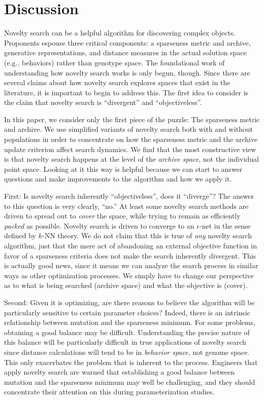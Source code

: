 \documentclass[twoside]{article}
\begin{document}
\section{Discussion}
\label{sec:discussion}

Novelty search can be a helpful algorithm for discovering complex objects.  Proponents espouse three critical components:  a sparseness metric and archive, generative representations, and distance measures in the actual solution space (e.g., behaviors) rather than genotype space.  The foundational work of understanding how novelty search works is only begun, though.  Since there are several claims about how novelty search explores spaces that exist in the literature, it is important to begin to address this.  The first idea to consider is the claim that novelty search is ``divergent'' and ``objectiveless''.  

In this paper, we consider only the first piece of the puzzle:  The sparseness metric and archive.  We use simplified variants of novelty search both with and without populations in order to concentrate on how the sparseness metric and the archive update criterion affect search dynamics.  We find that the most constructive view is that novelty search happens at the level of the \emph{archive space}, not the individual point space.  Looking at it this way is helpful because we can start to answer questions and make improvements to the algorithm and how we apply it.

First:  Is novelty search inherently ``objectiveless'', does it ``diverge''?  The answer to this question is very clearly, ``no.''   At least some novelty search methods are driven to spread out to \emph{cover} the space, while trying to remain as efficiently \emph{packed} as possible.  Novelty search is driven to converge to an $\epsilon$-net in the sense defined by $k$-NN theory.  We do not claim that this is true of \emph{any} novelty search algorithm, just that the mere act of abandoning an external objective function in favor of a sparseness criteria does not make the search inherently divergent.  This is actually good news, since it means we can analyze the search process in similar ways as other optimization processes.  We simply have to change our perspective as to what is being searched (archive space) and what the objective is (cover).

Second: Given it is optimizing, are there reasons to believe the algorithm will be particularly sensitive to certain parameter choices?  Indeed, there is an intrinsic relationship between mutation and the sparseness minimum.  For some problems, obtaining a good balance may be difficult.  Understanding the precise nature of this balance will be particularly difficult in true applications of novelty search since distance calculations will tend to be in \emph{behavior space}, not genome space.  This only exacerbates the problem that is inherent to the process.  Engineers that apply novelty search are warned that establishing a good balance between mutation and the sparseness minimum may well be challenging, and they should concentrate their attention on this during parameterization studies.
\end{document}
